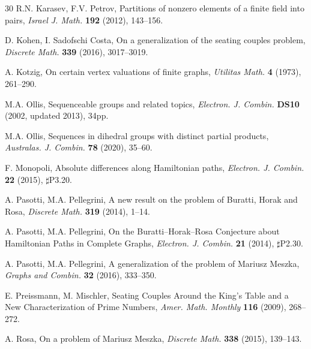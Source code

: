 \documentclass{amsart}
\theoremstyle{definition}
\numberwithin{equation}{section}
\begin{document}
\begin{thebibliography}{30}
 R.N. Karasev, F.V. Petrov,
Partitions of nonzero elements of a finite field into pairs,
\textit{Israel J. Math.} \textbf{192} (2012), 143--156.


 D. Kohen, I. Sadofschi Costa,
On a generalization of the seating couples problem,
\textit{Discrete Math.} \textbf{339} (2016), 3017--3019.


 A. Kotzig,
On certain vertex valuations of finite graphs,
\textit{Utilitas Math.} \textbf{4} (1973), 261--290.

 M.A. Ollis,
Sequenceable groups and related topics,
\textit{Electron. J. Combin.} \textbf{DS10} (2002, updated 2013), 34pp.

 M.A. Ollis,
Sequences in dihedral groups with distinct partial products,
\textit{Australas. J. Combin.} \textbf{78} (2020), 35--60.

 F. Monopoli,
Absolute differences along Hamiltonian paths,
\textit{Electron. J. Combin.} \textbf{22} (2015), $\sharp$P3.20.

 A. Pasotti, M.A. Pellegrini,
A new result on the problem of Buratti, Horak and Rosa,
\textit{Discrete Math.} \textbf{319} (2014), 1--14.

 A. Pasotti, M.A. Pellegrini,
On the Buratti--Horak--Rosa Conjecture about Hamiltonian Paths in Complete Graphs,
\textit{Electron. J. Combin.} \textbf{21} (2014), $\sharp$P2.30.

 A. Pasotti, M.A. Pellegrini,
A generalization of the problem of Mariusz Meszka,
\textit{Graphs and Combin.} \textbf{32} (2016), 333--350.

 E. Preissmann, M. Mischler,
Seating Couples Around the King's Table and a New Characterization of Prime Numbers,
\textit{Amer. Math. Monthly} \textbf{116} (2009),  268--272.

 A. Rosa, On a problem of Mariusz Meszka,
\textit{Discrete Math.} \textbf{338} (2015), 139--143.

\end{thebibliography}
\end{document}

